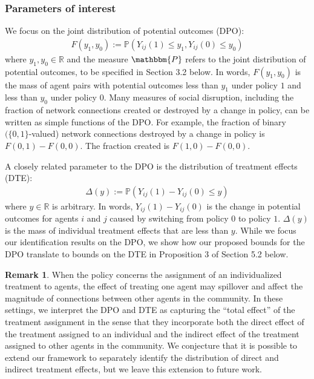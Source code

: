\documentclass[12pt]{article}
\theoremstyle{definition}
\newtheorem{remark}{Remark}
\begin{document}
\subsubsection{Parameters of interest}
We focus on the joint distribution of potential outcomes (DPO):  
\begin{align}\label{joint}
F(y_{1},y_{0}) := \mathbb{P}\left(Y_{ij}(1)  \leq y_1, Y_{ij}(0)  \leq y_{0}\right)
\end{align}
where $y_{1},y_{0} \in \mathbb{R}$ and the measure $\mathbbm{P}$ refers to the joint distribution of potential outcomes, to be specified in Section 3.2 below. In words, $F(y_{1},y_{0}) $ is the mass of agent pairs with potential outcomes less than $y_{1}$ under policy $1$ and less than $y_{0}$ under policy $0$. Many measures of social disruption, including the fraction of network connections created or destroyed by a change in policy, can be written as simple functions of the DPO. For example, the fraction of binary $(\{0,1\}$-valued) network connections destroyed by a change in policy is $F(0,1) - F(0,0)$. The fraction created is $F(1,0) - F(0,0)$.  

A closely related parameter to the DPO is the distribution of treatment effects (DTE):  
\begin{align}\label{te}
\Delta(y) := \mathbb{P}\left(Y_{ij}(1) - Y_{ij}(0) \leq y \right)
\end{align}
where $y \in \mathbb{R}$ is arbitrary. In words,  $Y_{ij}(1) - Y_{ij}(0)$ is the change in potential outcomes for agents $i$ and $j$ caused by switching from policy $0$ to policy $1$. $\Delta(y)$ is the mass of individual treatment effects that are less than $y$. While we focus our identification results on the DPO, we show how our proposed bounds for the DPO translate to bounds on the DTE in Proposition 3 of Section 5.2 below.    

\begin{remark}
When the policy concerns the assignment of an individualized treatment to agents, the effect of treating one agent may spillover and affect the magnitude of connections between other agents in the community. In these settings, we interpret the DPO and DTE as capturing the ``total effect'' of the treatment assignment in the sense that they incorporate both the direct effect of the treatment assigned to an individual and the indirect effect of the treatment assigned to other agents in the community. We conjecture that it is possible to extend our framework to separately identify the distribution of direct and indirect treatment effects, but we leave this extension to future work.   
\end{remark}
\end{document}
